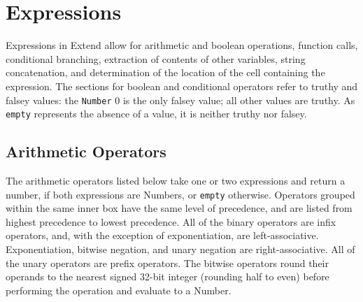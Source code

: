 \section{Expressions}
	Expressions in Extend allow for arithmetic and boolean operations, function calls, conditional branching, extraction of contents of other variables, string concatenation, and determination of the location of the cell containing the expression. The sections for boolean and conditional operators refer to truthy and falsey values: the \texttt{Number} 0 is the only falsey value; all other values are truthy. As \texttt{empty} represents the absence of a value, it is neither truthy nor falsey.
	\pagebreak
		\subsection{Arithmetic Operators}
			The arithmetic operators listed below take one or two expressions and return a number, if both expressions are Numbers, or \texttt{empty} otherwise. Operators grouped within the same inner box have the same level of precedence, and are listed from highest precedence to lowest precedence. All of the binary operators are infix operators, and, with the exception of exponentiation, are left-associative. Exponentiation, bitwise negation, and unary negation are right-associative. All of the unary operators are prefix operators. The bitwise operators round their operands to the nearest signed 32-bit integer (rounding half to even) before performing the operation and evaluate to a Number.
